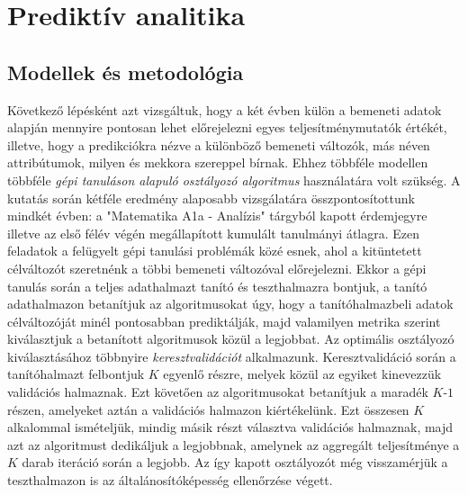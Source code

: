 \documentclass[12pt]{article}
\begin{document}
\newpage
\section{Prediktív analitika}

\subsection{Modellek és metodológia}

Következő lépésként azt vizsgáltuk, hogy a két évben külön a bemeneti adatok alapján mennyire pontosan lehet előrejelezni egyes teljesítménymutatók értékét, illetve, hogy a predikciókra nézve a különböző bemeneti változók, más néven attribútumok, milyen és mekkora szereppel bírnak. Ehhez többféle modellen többféle \textit{gépi tanuláson alapuló osztályozó algoritmus} használatára volt szükség. A kutatás során kétféle eredmény alaposabb vizsgálatára összpontosítottunk mindkét évben: a "Matematika A1a - Analízis" tárgyból kapott érdemjegyre illetve az első félév végén megállapított kumulált tanulmányi átlagra. Ezen feladatok a felügyelt gépi tanulási problémák közé esnek, ahol a kitüntetett célváltozót szeretnénk a többi bemeneti változóval előrejelezni\cite{bevadat}. Ekkor a gépi tanulás során a teljes adathalmazt tanító és teszthalmazra bontjuk, a tanító adathalmazon betanítjuk az algoritmusokat úgy, hogy a tanítóhalmazbeli adatok célváltozóját minél pontosabban prediktálják, majd valamilyen metrika szerint kiválasztjuk a betanított algoritmusok közül a legjobbat. Az optimális osztályozó kiválasztásához többnyire \textit{keresztvalidációt} alkalmazunk. Keresztvalidáció során a tanítóhalmazt felbontjuk $K$ egyenlő részre, melyek közül az egyiket kinevezzük validációs halmaznak. Ezt követően az algoritmusokat betanítjuk a maradék $K$-$1$ részen, amelyeket aztán a validációs halmazon kiértékelünk. Ezt összesen $K$ alkalommal ismételjük, mindig másik részt választva validációs halmaznak, majd azt az algoritmust dedikáljuk a legjobbnak, amelynek az aggregált teljesítménye a $K$ darab iteráció során a legjobb. Az így kapott osztályozót még visszamérjük a teszthalmazon is az általánosítóképesség ellenőrzése végett. %
\end{document}
